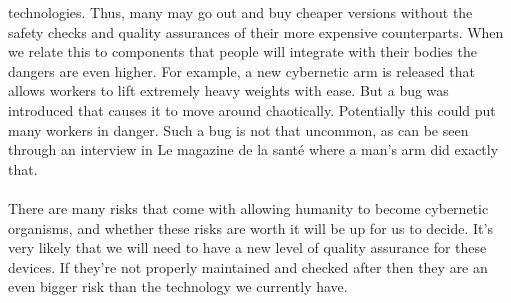 \documentclass[12pt,a4paper,notitlepage]{article}
\begin{document}
technologies. Thus, many may go out and buy cheaper versions without the safety
checks and quality assurances of their more expensive counterparts. When we
relate this to components that people will integrate with their bodies the
dangers are even higher. For example, a new cybernetic arm is released that
allows workers to lift extremely heavy weights with ease. But a bug was
introduced that causes it to move around chaotically. Potentially this could put
many workers in danger. Such  a bug is not that uncommon, as can be seen through
an interview in Le magazine de la sant\'{e} where a man's arm did exactly that. 
\\\\
There are many risks that come with allowing humanity to become cybernetic
organisms, and whether these risks are worth it will be up for us to decide.
It's very likely that we will need to have a new level of quality assurance for
these devices. If they're not properly maintained and checked after then they
are an even bigger risk than the technology we currently have.
\\
\end{document}
